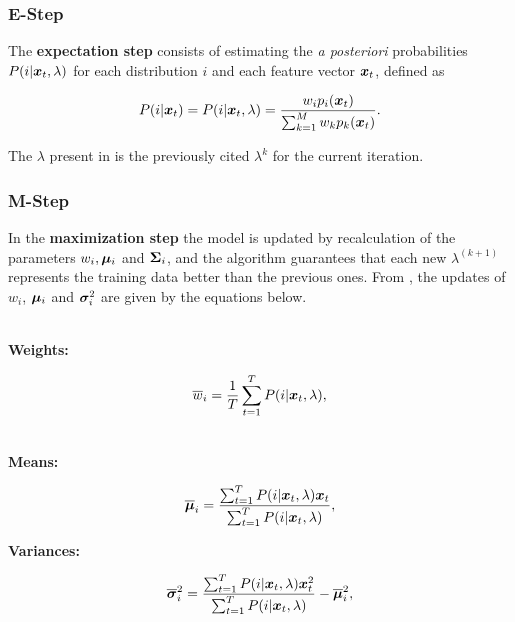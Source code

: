 \subsubsection*{E-Step}

The \textbf{expectation step} consists of estimating the \emph{a posteriori} probabilities $P(i|\boldsymbol{x}_t, \lambda)$ for each distribution $i$ and each feature vector $\boldsymbol{x}_t$, defined as

\begin{equation}
    \postprob{i}{\dvec{x}_t} = \postprob{i}{\dvec{x}_t, \lambda} = \frac{w_i p_i(\dvec{x}_t)}{\sum_{k=1}^M w_k p_k(\dvec{x}_t)}.
    \label{eq:e-step-posterior}
\end{equation}

\noindent The $\lambda$ present in  is the previously cited $\lambda^{k}$ for the current iteration.

\subsubsection*{M-Step}

In the \textbf{maximization step} the model is updated by recalculation of the parameters $w_i, \boldsymbol{\mu}_i$ and $\boldsymbol{\Sigma}_i$, and the algorithm guarantees that each new $\lambda^{(k+1)}$ represents the training data better than the previous ones. From , the updates of $w_i$, $\boldsymbol{\mu}_i$ and $\boldsymbol{\sigma}_i^2$ are given by the equations below.

\noindent\\\textbf{Weights:}

\begin{equation}
    \overline{w}_i = \frac{1}{T} \sum_{t=1}^T \postprob{i}{\dvec{x}_t, \lambda},
    \label{eq:m-step-weight}
\end{equation}

\noindent\\\textbf{Means:}

\begin{equation}
    \overline{\dvec{\mu}}_i = \frac{\sum_{t=1}^T \postprob{i}{\dvec{x}_t, \lambda} \dvec{x}_t}{\sum_{t=1}^T \postprob{i}{\dvec{x}_t, \lambda}},
    \label{eq:m-step-means}
\end{equation}

\noindent\textbf{Variances:}

\begin{equation}
    \overline{\dvec{\sigma}}_i^2 = \frac{\sum_{t=1}^T \postprob{i}{\dvec{x}_t, \lambda} \dvec{x}_t^2}{\sum_{t=1}^T \postprob{i}{\dvec{x}_t, \lambda}} - \overline{\dvec{\mu}}_i^2,
    \label{eq:m-step-variances}
\end{equation}


